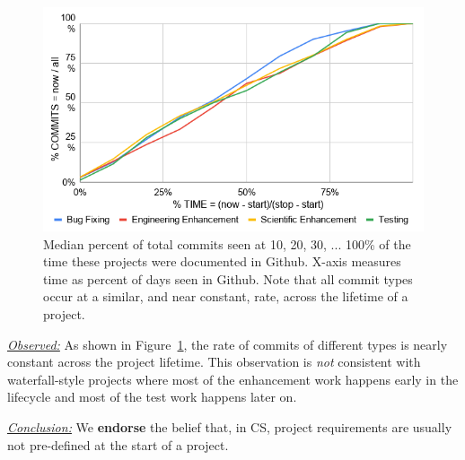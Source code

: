 \documentclass[sigconf,review,anonymous]{acmart}
\newcommand{\fig}[1]{Figure~\ref{fig:#1}}
\newenvironment{RQ}{\vspace{1mm}\begin{tcolorbox}[enhanced,width=3.4in,size=fbox,colback=red!5!white,drop shadow southeast,sharp corners]}{\end{tcolorbox}}
\begin{document}
\begin{figure}[!t]
\begin{center}\includegraphics[width=\linewidth]{img/belief1_1.png}\end{center} 
\caption{Median percent  of total commits seen
at 10, 20, 30, ... 100\% of 
the time these projects were
documented in Github.
X-axis measures time as percent of days seen in Github.
Note
that all commit types occur
at a similar, and near constant,
 rate, across the lifetime of a project.}\label{fig:belief1} 
\end{figure}
\noindent \textit{\underline{Observed:}} 
As shown in \fig{belief1}, the rate
of commits of different types
is nearly constant across the project
lifetime. This observation is {\em not} consistent with 
waterfall-style projects where most of the enhancement work happens early in the lifecycle and most of the test work happens later on.
\vspace{-2mm}
\begin{RQ}
\textit{\underline{Conclusion:}}
We \textbf{endorse} the belief that, in CS, project requirements are usually not pre-defined
at the start of a project.
\end{RQ}
 
\end{document}
